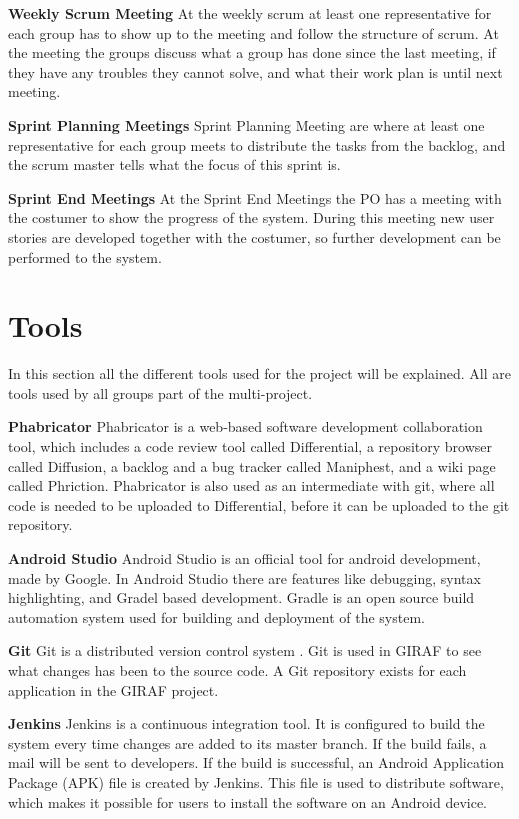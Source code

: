 \textbf{Weekly Scrum Meeting}
At the weekly scrum at least one representative for each group has to show up to the meeting and follow the structure of scrum. At the meeting the groups discuss what a group has done since the last meeting, if they have any troubles they cannot solve, and what their work plan is until next meeting. 

\textbf{Sprint Planning Meetings}
Sprint Planning Meeting are where at least one representative for each group meets to distribute the tasks from the backlog, and the scrum master tells what the focus of this sprint is. 

\textbf{Sprint End Meetings}
At the Sprint End Meetings the PO has a meeting with the costumer to show the progress of the system. During this meeting new user stories are developed together with the costumer, so further development can be performed to the system.


\section{Tools}
In this section all the different tools used for the project will be explained. All are tools used by all groups part of the multi-project.

\textbf{Phabricator}
Phabricator is a web-based software development collaboration tool, which includes a code review tool called Differential, a repository browser called Diffusion, a backlog and a bug tracker called Maniphest, and a wiki page called Phriction. Phabricator is also used as an intermediate with git, where all code is needed to be uploaded to Differential, before it can be uploaded to the git repository. 

\textbf{Android Studio}
Android Studio is an official tool for android development, made by Google. In Android Studio there are features like debugging, syntax highlighting, and Gradel based development. Gradle is an open source build automation system used for building and deployment of the system.\cite{Android_Studio}

\textbf{Git}
Git is a distributed version control system \cite{Git}. Git is used in GIRAF to see what changes has been to the source code. A Git repository exists for each application in the GIRAF project. 

\textbf{Jenkins}
Jenkins is a continuous integration tool. It is configured to build the system every time changes are added to its master branch. \cite{Jenkins} If the build fails, a mail will be sent to developers. If the build is successful, an Android Application Package (APK) file is created by Jenkins. This file is used to distribute software, which makes it possible for users to install the software on an Android device. 
